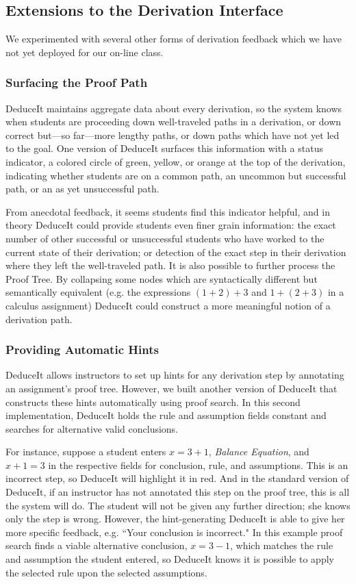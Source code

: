 \documentclass{sigchi}
\begin{document}
\subsection{Extensions to the Derivation Interface}

We experimented with several other forms of derivation feedback which we have not yet deployed for our on-line class.

\subsubsection{Surfacing the Proof Path}

DeduceIt maintains aggregate data about every derivation, so the system knows when students are proceeding down well-traveled paths in a derivation, or down correct but---so far---more lengthy paths, or down paths which have not yet led to the goal. One version of DeduceIt surfaces this information with a status indicator, a colored circle of green, yellow, or orange at the top of the derivation, indicating whether students are on a common path, an uncommon but successful path, or an as yet unsuccessful path. 

From anecdotal feedback, it seems students find this indicator helpful, and in theory DeduceIt could provide students even finer grain information: the exact number of other successful or unsuccessful students who have worked to the current state of their derivation; or detection of the exact step in their derivation where they left the well-traveled path. It is also possible to further process the Proof Tree. By collapsing some nodes which are syntactically different but semantically equivalent (e.g. the expressions $(1+2)+3$ and $1+(2+3)$ in a calculus assignment) DeduceIt could construct a more meaningful notion of a derivation path.

\subsubsection{Providing Automatic Hints}

DeduceIt allows instructors to set up hints for any derivation step by annotating an assignment's proof tree. However, we built another version of DeduceIt that constructs these hints automatically using proof search. In this second implementation, DeduceIt holds the rule and assumption fields constant and searches for alternative valid conclusions. 

For instance, suppose a student enters $x=3+1$, \textit{Balance Equation}, and $x+1=3$ in the respective fields for conclusion, rule, and assumptions. This is an incorrect step, so DeduceIt will highlight it in red. And in the standard version of DeduceIt, if an instructor has not annotated this step on the proof tree, this is all the system will do. The student will not be given any further direction; she knows only the step is wrong. However, the hint-generating DeduceIt is able to give her more specific feedback, e.g. ``Your conclusion is incorrect." In this example proof search finds a viable alternative conclusion, $x=3-1$, which matches the rule and assumption the student entered, so DeduceIt knows it is possible to apply the selected rule upon the selected assumptions.
\end{document}
